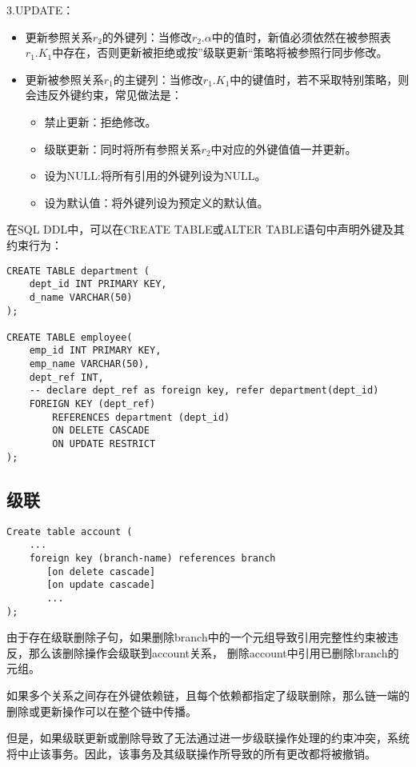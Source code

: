 3.UPDATE：
\begin{itemize}
    \item 更新参照关系$r_2$的外键列：当修改$r_2.\alpha$中的值时，新值必须依然在被参照表$r_1.K_1$中存在，否则更新被拒绝或按”级联更新“策略将被参照行同步修改。
    \item 更新被参照关系$r_1$的主键列：当修改$r_1.K_1$中的键值时，若不采取特别策略，则会违反外键约束，常见做法是：
       \begin{itemize}
          \item 禁止更新：拒绝修改。
          \item 级联更新：同时将所有参照关系$r_2$中对应的外键值值一并更新。
          \item 设为NULL:将所有引用的外键列设为NULL。
          \item 设为默认值：将外键列设为预定义的默认值。
       \end{itemize}
\end{itemize}

在SQL DDL中，可以在CREATE TABLE或ALTER TABLE语句中声明外键及其约束行为：
\begin{lstlisting}[style=sqlstyle]
CREATE TABLE department (
    dept_id INT PRIMARY KEY,
    d_name VARCHAR(50)
);

CREATE TABLE employee(
    emp_id INT PRIMARY KEY,
    emp_name VARCHAR(50),
    dept_ref INT,
    -- declare dept_ref as foreign key, refer department(dept_id)
    FOREIGN KEY (dept_ref)
        REFERENCES department (dept_id)
        ON DELETE CASCADE
        ON UPDATE RESTRICT
);
\end{lstlisting}

\subsection{级联}

\begin{lstlisting}[style=sqlstyle]
Create table account (
    ... 
    foreign key (branch-name) references branch
       [on delete cascade]
       [on update cascade]
       ...
);    
\end{lstlisting}

由于存在级联删除子句，如果删除branch中的一个元组导致引用完整性约束被违反，那么该删除操作会级联到account关系，
删除account中引用已删除branch的元组。

如果多个关系之间存在外键依赖链，且每个依赖都指定了级联删除，那么链一端的删除或更新操作可以在整个链中传播。

但是，如果级联更新或删除导致了无法通过进一步级联操作处理的约束冲突，系统将中止该事务。因此，该事务及其级联操作所导致的所有更改都将被撤销。

